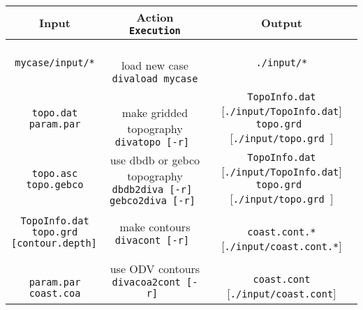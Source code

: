 \begin{table}
{\scriptsize{
\begin{tabular}{c|c|c}
\toprule
{\Large{Input}} & \shortstack{\Large{{\sf Action}} \\
{\Large{{\tt Execution}}} } & {\Large{ Output}} \\ \midrule
{\tt mycase/input/*}  & 
\shortstack{ 
{  { }  } \\
{\sf load new case} \\
{\tt divaload mycase} } & {\tt ./input/*} \\ \hline
\shortstack{
{\tt topo.dat} \\
{\tt param.par}
}
 & 
\shortstack{
{  { }  } \\
{\sf make gridded topography} \\
{\tt divatopo [-r]  } 
\\
{  { }  }
}
& 
\shortstack{
{\tt TopoInfo.dat} { } [{\tt ./input/TopoInfo.dat}] \\
{\tt topo.grd }  { } [{\tt ./input/topo.grd }]
}
\\ \hline
 \shortstack{
{\tt topo.asc} \\
{\tt topo.gebco} 
}
 & 
\shortstack{
{\sf use dbdb or gebco topography} \\
{\tt dbdb2diva [-r]  } 
\\
{\tt gebco2diva [-r]  } 
}
& 
\shortstack{
{\tt TopoInfo.dat} { } [{\tt ./input/TopoInfo.dat}] \\
{\tt topo.grd }  { } [{\tt ./input/topo.grd }]
}
 \\ \hline
 \shortstack{
{\tt TopoInfo.dat} \\
{\tt topo.grd} \\
{\tt [contour.depth] }
}
 & 
\shortstack{
{\sf make contours} \\
{\tt divacont [-r]  } 
\\
{  { }  }
}
& 
\shortstack{
{  { }  } \\
{\tt coast.cont.*}  { } [{\tt ./input/coast.cont.*}] \\
{  { }  }
}
 \\ \hline
 \shortstack{
 {  { }  } \\
{\tt param.par} \\
{\tt coast.coa} 
}
 & 
\shortstack{
{\sf use ODV contours} \\
{\tt divacoa2cont [-r]  } 
\\
{  { }  }
}
& 
\shortstack{
{  { }  } \\
{\tt coast.cont}  { } [{\tt ./input/coast.cont}] \\
{  { }  }
}
 \\ \hline

\end{tabular}}}
\end{table}
